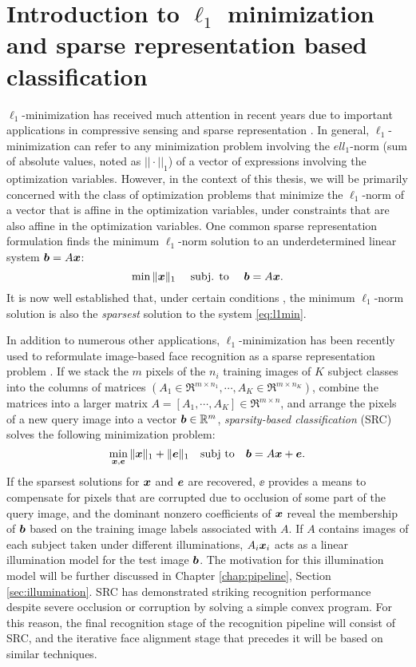 \section{Introduction to $\ell_1$ minimization and sparse representation based classification}
%
$\ell_1$-minimization has received much attention in recent years due to
important applications in compressive sensing \cite{BrucksteinA2007} and sparse
representation \cite{WrightJ2010-PIEEE}.  
In general, $\ell_1$-minimization can refer to any minimization problem involving the 
$ell_1$-norm (sum of absolute values, noted as $||\cdot||_1$) of a vector of expressions involving the optimization
variables. However, in the context of this thesis, we will be primarily concerned with
the class of optimization problems that minimize the $\ell_1$-norm of a vector that
is affine in the optimization variables, under constraints that are also affine in the optimization variables.
One common sparse representation formulation finds the minimum $\ell_1$-norm solution to an
underdetermined linear system $\boldsymbol{b}=A{\boldsymbol{x}}$:
%
\begin{equation} 
\min \|{\boldsymbol{x}}\|_1\quad \mbox{ subj. to }\quad \boldsymbol{b} = A{\boldsymbol{x}}.
\label{eq:l1min} 
\end{equation}
%
It is now well established that, under certain conditions
\cite{CandesE2005-IT_1,DonohoD2004}, the minimum $\ell_1$-norm solution is also
the \emph{sparsest} solution to the system \eqref{eq:l1min}.

In addition to numerous other applications, $\ell_1$-minimization has been recently used to reformulate
image-based face recognition as a sparse representation problem
\cite{WrightJ2009-PAMI}.  If we stack the $m$ pixels of the $n_i$ training images of $K$ subject
classes into the columns of matrices $(A_1\in\Re^{m\times n_1}, \cdots, A_K\in\Re^{m\times n_K})$, combine
the matrices into a larger matrix $A = [A_1, \cdots, A_K]\in\Re^{m\times n}$, and arrange the pixels of a new
query image into a vector $\boldsymbol{b}\in\mathbb R^m$, \emph{sparsity-based
classification} (SRC) solves the following minimization problem:
\begin{equation}
\min_{{\boldsymbol{x}}, {\boldsymbol{e}}} \| {\boldsymbol{x}} \|_1 + \|{\boldsymbol{e}}\|_1 \quad \textup{subj to} \quad \boldsymbol{b} = A {\boldsymbol{x}} + {\boldsymbol{e}}.
\label{eq:l1min_denoise}
\end{equation}
If the sparsest solutions for ${\boldsymbol{x}}$ and $\boldsymbol{e}$ are recovered, $\ee$ provides a
means to compensate for pixels that are corrupted due to occlusion of some part of the query
image, and the dominant nonzero coefficients of ${\boldsymbol{x}}$ reveal the membership of
$\boldsymbol{b}$ based on the training image labels associated with $A$. 
If $A$ contains images of each subject taken under different illuminations, 
$A_i{\boldsymbol{x}}_i$ acts as a linear illumination model for the test image $\boldsymbol{b}$.  The motivation
for this illumination model will be further discussed in Chapter \ref{chap:pipeline}, Section \ref{sec:illumination}.
SRC has demonstrated striking recognition performance
despite severe occlusion or corruption by solving a simple convex program.  For
this reason, the final recognition stage of the recognition pipeline will consist of
SRC, and the iterative face alignment stage that precedes it will be based on
similar techniques.

